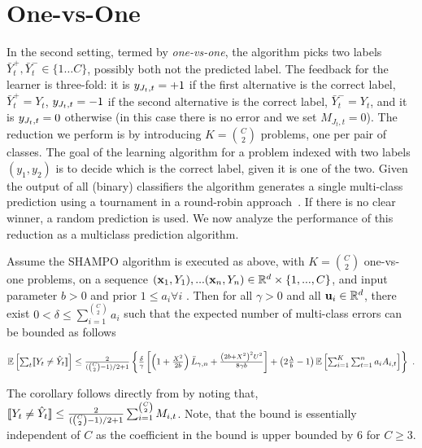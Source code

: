 \section{One-vs-One}
In the second setting, termed by {\em one-vs-one}, the algorithm picks two labels $\bar{Y}^+_t,\bar{Y}^-_t \in\{1 \dots C\}$, possibly both not the predicted label. The feedback for the learner is three-fold: it is $y_{J_t,t}=+1$ if the first alternative is the correct label, $\bar{Y}^+_t=Y_t$, $y_{J_t,t}=-1$ if the second alternative is the correct label, $\bar{Y}^-_t=Y_t$, and it is $y_{J_t,t}=0$ otherwise (in this case there is no error and we set $M_{J_t,t}=0$). The reduction we perform is by introducing $K= {C \choose 2}$ problems, one per pair of classes.  The goal of the learning algorithm for a problem indexed with two labels $(y_1,y_2)$ is to decide which is the correct label, given it is one of the two. Given the output of all (binary) classifiers the algorithm generates a single multi-class prediction using a tournament in a round-robin approach~\cite{DBLP:journals/jmlr/Furnkranz02}. If there is no clear winner, a random prediction is used. We now analyze the performance of this reduction as a multiclass prediction algorithm.
\begin{corollary}
Assume the SHAMPO algorithm is executed as above, with $K={C \choose 2}$ one-vs-one problems, on a sequence $(\mathbf{x}_1,Y_1),...(\mathbf{x}_n,Y_n)\in\mathbb{R}^d\times\{1,...,C\}$, and input parameter $b>0$ and prior $1\le a_i\forall i$ . Then for all $\gamma>0$ and all $\mathbf{u}_{i}\in\mathbb{R}^d$, there exist $0<\delta\le \sum_{i=1}^{C \choose 2}a_{i}$ such that the expected number of multi-class errors can be bounded as follows

\(
\mathbb{E}\left[{\sum_t [\![{Y_t \neq \hat{Y}_t}]\!]}\right]\le \frac{2}{({C \choose 2}-1)/2+1}\left\{{ \frac{\delta}{\gamma}\left[{\left({1+\frac{X^2}{2b} }\right){\bar L}_{\gamma,n}+\frac{\left({{2b+X^2}}\right)^2U^{2}}{8{\gamma}b}}\right]+\left({2\frac{\lambda}{b}-1}\right)\mathbb{E}\left[{\sum_{i=1}^{K}\sum_{t=1}^{n}{a_{i}A_{i,t}}}\right]}\right\}~.
\)
\end{corollary}
The corollary follows directly from  by noting that, $[\![{Y_t \neq \hat{Y}_t}]\!] \leq \frac{2}{({C \choose 2}-1)/2+1}\sum_{i=1}^{ {C \choose 2}} M_{i,t}$. Note, that the bound is essentially  independent of $C$ as the coefficient in the bound is upper bounded by $6$ for $C \geq 3$.

